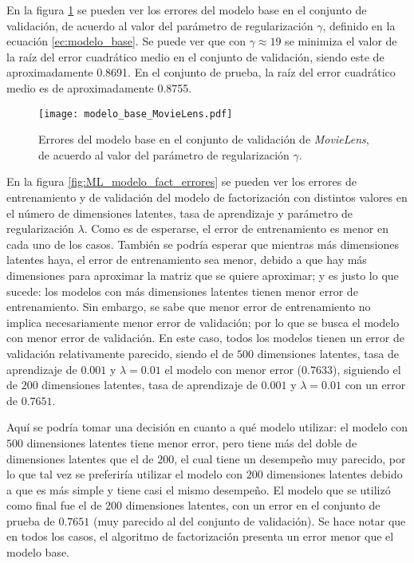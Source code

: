 En la figura \ref{fig:ML_modelo_base_errores} se pueden ver los errores del modelo base en el conjunto de validación, de acuerdo al valor del parámetro de regularización $\gamma$, definido en la ecuación \ref{ec:modelo_base}. Se puede ver que con $\gamma \approx 19$ se minimiza el valor de la raíz del error cuadrático medio en el conjunto de validación, siendo este de aproximadamente 0.8691. En el conjunto de prueba, la raíz del error cuadrático medio es de aproximadamente 0.8755.

\begin{figure}[H]
	\centering
 	\texttt{[image: modelo\_base\_MovieLens.pdf]}
 	\caption{Errores del modelo base en el conjunto de validación de \textit{MovieLens}, de acuerdo al valor del parámetro de regularización $\gamma$.}
 	\label{fig:ML_modelo_base_errores}
\end{figure}

En la figura \ref{fig:ML_modelo_fact_errores} se pueden ver los errores de entrenamiento y de validación del modelo de factorización con distintos valores en el número de dimensiones latentes, tasa de aprendizaje y parámetro de regularización $\lambda$. Como es de esperarse, el error de entrenamiento es menor en cada uno de los casos. También se podría esperar que mientras más dimensiones latentes haya, el error de entrenamiento sea menor, debido a que hay más dimensiones para aproximar la matriz que se quiere aproximar; y es justo lo que sucede: los modelos con más dimensiones latentes tienen menor error de entrenamiento. Sin embargo, se sabe que menor error de entrenamiento no implica necesariamente menor error de validación; por lo que se busca el modelo con menor error de validación. En este caso, todos los modelos tienen un error de validación relativamente parecido, siendo el de $500$ dimensiones latentes, tasa de aprendizaje de $0.001$ y $\lambda = 0.01$ el modelo con menor error ($0.7633$), siguiendo el de $200$ dimensiones latentes, tasa de aprendizaje de $0.001$ y $\lambda = 0.01$ con un error de $0.7651$. 

Aquí se podría tomar una decisión en cuanto a qué modelo utilizar: el modelo con $500$ dimensiones latentes tiene menor error, pero tiene más del doble de dimensiones latentes que el de $200$, el cual tiene un desempeño muy parecido, por lo que tal vez se preferiría utilizar el modelo con $200$ dimensiones latentes debido a que es más simple y tiene casi el mismo desempeño. El modelo que se utilizó como final fue el de $200$ dimensiones latentes, con un error en el conjunto de prueba de $0.7651$ (muy parecido al del conjunto de validación). Se hace notar que en todos los casos, el algoritmo de factorización presenta un error menor que el modelo base.

